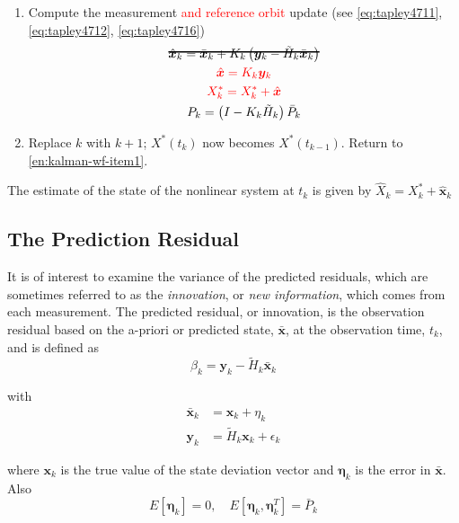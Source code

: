 \begin{enumerate}
  \item Compute the measurement \textcolor{red}{and reference orbit} update (see \ref{eq:tapley4711}, \ref{eq:tapley4712}, \ref{eq:tapley4716})
    \begin{subequations}
    \begin{gather}
      \hcancel{\hat{\bm{x}}_k = \bar{\bm{x}}_k + K_k \left( \bm{y}_k - \tilde{H}_k \bar{\bm{x}}_k \right)} \\
      \textcolor{red}{\hat{\bm{x}} = K_k \bm{y}_k} \\
      \textcolor{red}{X^*_k = X^*_k + \hat{\bm{x}}} \\
      P_k = \left( I - K_k \tilde{H}_k \right) \bar{P}_k
    \end{gather}
    \end{subequations}

  \item Replace \(k\) with \(k+1\); \(X^*(t_k)\) now becomes \(X^*(t_{k-1})\).
  Return to \ref{en:kalman-wf-item1}.

\end{enumerate}

The estimate of the state of the nonlinear system at \(t_k\) is given by 
\(\hat{X}_k = X^*_k + \hat{\bm{x}}_k\)

\subsection{The Prediction Residual}
It is of interest to examine the variance of the predicted residuals, which are
sometimes referred to as the \emph{innovation}, or \emph{new information}, which 
comes from each measurement. The predicted residual, or innovation, is the observation 
residual based on the a-priori or predicted state, \(\bar{\bm{x}}\), at the observation 
time, \(t_k\), and is defined as
\begin{equation}
  \label{eq:tapley4733}
  \beta _k = \bm{y}_k - \tilde{H}_k \bar{\bm{x}}_k
\end{equation}

with
\begin{equation}
  \begin{aligned}
    \bar{\bm{x}}_k &= \bm{x}_k + \eta _k \\
    \bm{y}_k &= \tilde{H}_k \bm{x}_k + \epsilon _k
  \end{aligned}
\end{equation}

where \(\bm{x}_k\) is the true value of the state deviation vector and \(\bm{\eta}_k\) 
is the error in \(\bar{\bm{x}}\). Also
\begin{equation}
  E \left[ \bm{\eta}_k \right] = 0, \quad 
  E \left[ \bm{\eta}_k , \bm{\eta}^T_k \right] = \bar{P}_k
\end{equation}

